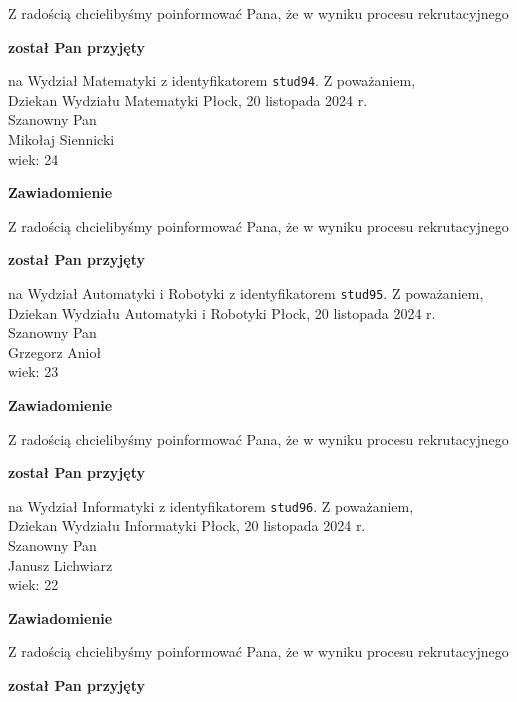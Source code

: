 \documentclass[12pt,a4paper]{article}
\begin{document}
\bigskip
Z radością chcielibyśmy poinformować Pana, że w wyniku procesu rekrutacyjnego 
\begin{center}
\textsf{\textbf{został Pan przyjęty}} 
\end{center}
na Wydział Matematyki z identyfikatorem \verb|stud94|. 
\vspace{2cm}
\noindent
Z poważaniem,\\
Dziekan
Wydziału Matematyki
\newpage
\hfill Płock, 20 listopada 2024 r.\\
\noindent 
Szanowny Pan \\
Mikołaj Siennicki \\
wiek: 24
\bigskip
\begin{center}
 	{\Large\textbf{Zawiadomienie}}
\end{center}
\bigskip
Z radością chcielibyśmy poinformować Pana, że w wyniku procesu rekrutacyjnego 
\begin{center}
\textsf{\textbf{został Pan przyjęty}} 
\end{center}
na Wydział Automatyki i Robotyki z identyfikatorem \verb|stud95|. 
\vspace{2cm}
\noindent
Z poważaniem,\\
Dziekan
Wydziału Automatyki i Robotyki
\newpage
\hfill Płock, 20 listopada 2024 r.\\
\noindent 
Szanowny Pan \\
Grzegorz Anioł \\
wiek: 23
\bigskip
\begin{center}
 	{\Large\textbf{Zawiadomienie}}
\end{center}
\bigskip
Z radością chcielibyśmy poinformować Pana, że w wyniku procesu rekrutacyjnego 
\begin{center}
\textsf{\textbf{został Pan przyjęty}} 
\end{center}
na Wydział Informatyki z identyfikatorem \verb|stud96|. 
\vspace{2cm}
\noindent
Z poważaniem,\\
Dziekan
Wydziału Informatyki
\newpage
\hfill Płock, 20 listopada 2024 r.\\
\noindent 
Szanowny Pan \\
Janusz Lichwiarz \\
wiek: 22
\bigskip
\begin{center}
 	{\Large\textbf{Zawiadomienie}}
\end{center}
\bigskip
Z radością chcielibyśmy poinformować Pana, że w wyniku procesu rekrutacyjnego 
\begin{center}
\textsf{\textbf{został Pan przyjęty}} 
\end{center}
\end{document}
